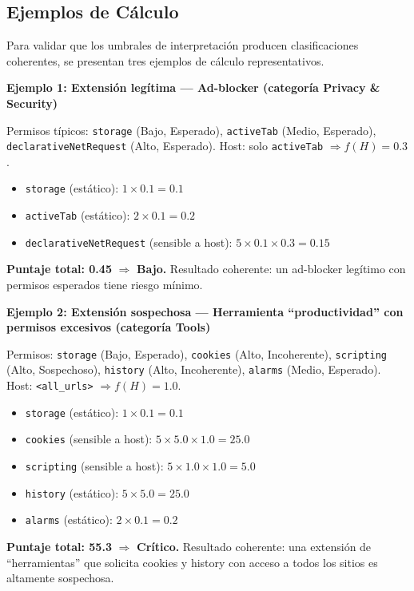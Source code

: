 \documentclass[12pt,oneside]{report}
\begin{document}
\subsection{Ejemplos de Cálculo}

Para validar que los umbrales de interpretación producen clasificaciones coherentes, se presentan tres ejemplos de cálculo representativos.

\textbf{Ejemplo 1: Extensión legítima --- Ad-blocker (categoría Privacy \& Security)}

Permisos típicos: \texttt{storage} (Bajo, Esperado), \texttt{activeTab} (Medio, Esperado), \texttt{declarativeNetRequest} (Alto, Esperado). Host: solo \texttt{activeTab} $\Rightarrow f(H)=0.3$.

\begin{itemize}
    \item \texttt{storage} (estático): $1 \times 0.1 = 0.1$
    \item \texttt{activeTab} (estático): $2 \times 0.1 = 0.2$
    \item \texttt{declarativeNetRequest} (sensible a host): $5 \times 0.1 \times 0.3 = 0.15$
\end{itemize}
\textbf{Puntaje total: 0.45} $\Rightarrow$ \textbf{Bajo.} Resultado coherente: un ad-blocker legítimo con permisos esperados tiene riesgo mínimo.

\textbf{Ejemplo 2: Extensión sospechosa --- Herramienta ``productividad'' con permisos excesivos (categoría Tools)}

Permisos: \texttt{storage} (Bajo, Esperado), \texttt{cookies} (Alto, Incoherente), \texttt{scripting} (Alto, Sospechoso), \texttt{history} (Alto, Incoherente), \texttt{alarms} (Medio, Esperado). Host: \texttt{<all\_urls>} $\Rightarrow f(H)=1.0$.

\begin{itemize}
    \item \texttt{storage} (estático): $1 \times 0.1 = 0.1$
    \item \texttt{cookies} (sensible a host): $5 \times 5.0 \times 1.0 = 25.0$
    \item \texttt{scripting} (sensible a host): $5 \times 1.0 \times 1.0 = 5.0$
    \item \texttt{history} (estático): $5 \times 5.0 = 25.0$
    \item \texttt{alarms} (estático): $2 \times 0.1 = 0.2$
\end{itemize}
\textbf{Puntaje total: 55.3} $\Rightarrow$ \textbf{Crítico.} Resultado coherente: una extensión de ``herramientas'' que solicita cookies y history con acceso a todos los sitios es altamente sospechosa.
\end{document}
